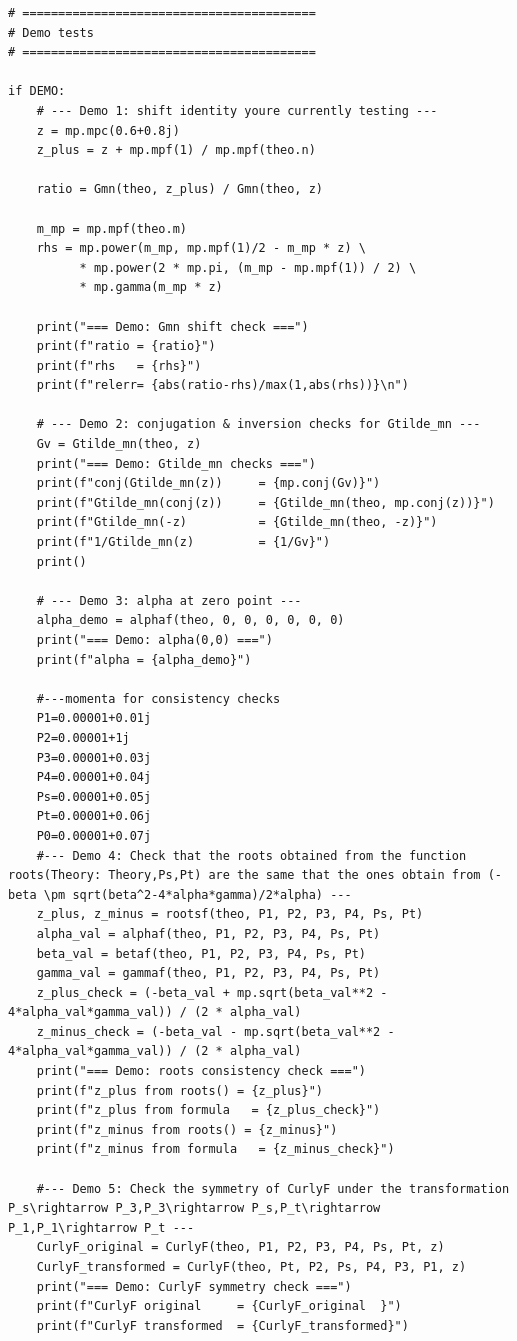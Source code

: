 \documentclass[11pt]{article}
\begin{document}
\begin{lstlisting}
# =========================================
# Demo tests
# =========================================

if DEMO:
    # --- Demo 1: shift identity youre currently testing ---
    z = mp.mpc(0.6+0.8j)
    z_plus = z + mp.mpf(1) / mp.mpf(theo.n)

    ratio = Gmn(theo, z_plus) / Gmn(theo, z)

    m_mp = mp.mpf(theo.m)
    rhs = mp.power(m_mp, mp.mpf(1)/2 - m_mp * z) \
          * mp.power(2 * mp.pi, (m_mp - mp.mpf(1)) / 2) \
          * mp.gamma(m_mp * z)

    print("=== Demo: Gmn shift check ===")
    print(f"ratio = {ratio}")
    print(f"rhs   = {rhs}")
    print(f"relerr= {abs(ratio-rhs)/max(1,abs(rhs))}\n")

    # --- Demo 2: conjugation & inversion checks for Gtilde_mn ---
    Gv = Gtilde_mn(theo, z)
    print("=== Demo: Gtilde_mn checks ===")
    print(f"conj(Gtilde_mn(z))     = {mp.conj(Gv)}")
    print(f"Gtilde_mn(conj(z))     = {Gtilde_mn(theo, mp.conj(z))}")
    print(f"Gtilde_mn(-z)          = {Gtilde_mn(theo, -z)}")
    print(f"1/Gtilde_mn(z)         = {1/Gv}")
    print()

    # --- Demo 3: alpha at zero point ---
    alpha_demo = alphaf(theo, 0, 0, 0, 0, 0, 0)
    print("=== Demo: alpha(0,0) ===")
    print(f"alpha = {alpha_demo}")

    #---momenta for consistency checks
    P1=0.00001+0.01j
    P2=0.00001+1j
    P3=0.00001+0.03j
    P4=0.00001+0.04j
    Ps=0.00001+0.05j
    Pt=0.00001+0.06j
    P0=0.00001+0.07j
    #--- Demo 4: Check that the roots obtained from the function roots(Theory: Theory,Ps,Pt) are the same that the ones obtain from (-beta \pm sqrt(beta^2-4*alpha*gamma)/2*alpha) ---
    z_plus, z_minus = rootsf(theo, P1, P2, P3, P4, Ps, Pt)
    alpha_val = alphaf(theo, P1, P2, P3, P4, Ps, Pt)
    beta_val = betaf(theo, P1, P2, P3, P4, Ps, Pt)
    gamma_val = gammaf(theo, P1, P2, P3, P4, Ps, Pt)
    z_plus_check = (-beta_val + mp.sqrt(beta_val**2 - 4*alpha_val*gamma_val)) / (2 * alpha_val)
    z_minus_check = (-beta_val - mp.sqrt(beta_val**2 - 4*alpha_val*gamma_val)) / (2 * alpha_val)
    print("=== Demo: roots consistency check ===")
    print(f"z_plus from roots() = {z_plus}")
    print(f"z_plus from formula   = {z_plus_check}")
    print(f"z_minus from roots() = {z_minus}")
    print(f"z_minus from formula   = {z_minus_check}")

    #--- Demo 5: Check the symmetry of CurlyF under the transformation P_s\rightarrow P_3,P_3\rightarrow P_s,P_t\rightarrow P_1,P_1\rightarrow P_t ---
    CurlyF_original = CurlyF(theo, P1, P2, P3, P4, Ps, Pt, z)
    CurlyF_transformed = CurlyF(theo, Pt, P2, Ps, P4, P3, P1, z)
    print("=== Demo: CurlyF symmetry check ===")
    print(f"CurlyF original     = {CurlyF_original  }")
    print(f"CurlyF transformed  = {CurlyF_transformed}")


\end{lstlisting}
\end{document}
